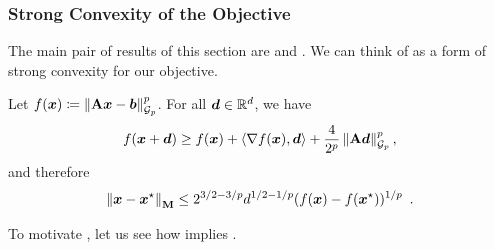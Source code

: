 \subsubsection{Strong Convexity of the Objective}

The main pair of results of this section are  and . We can think of  as a form of strong convexity for our objective.

\begin{lemma}
\label{lemma:strong_convexity_gp}
Let $f(\bm{x}) \coloneqq \left\lVert \mathbf{A}\bm{x}-\bm{b} \right\rVert_{\mathcal{G}_{p}}^p$. For all $\bm{d}\in\mathbb{R}^d$, we have
\begin{align*}
    f(\bm{x}+\bm{d}) \ge f(\bm{x}) + \left\langle \nabla f(\bm{x}),\bm{d} \right\rangle + \frac{4}{2^p}\left\lVert \mathbf{A}\bm{d} \right\rVert_{\mathcal{G}_{p}}^p,
\end{align*}
and therefore
\begin{align*}
    \left\lVert \bm{x}-\bm{x}^{\star} \right\rVert_{\mathbf{M}} \le 2^{3/2 - 3/p}d^{1/2-1/p}(f(\bm{x})-f(\bm{x}^{\star}))^{1/p}\enspace.
\end{align*}
\end{lemma}

\lemmastrongconvexitycomponent

To motivate , let us see how  implies .

